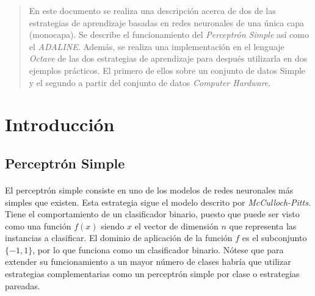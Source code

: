\documentclass{article}
\begin{document}
	\maketitle %

	\thispagestyle{fancy} %



	\begin{abstract}
		\noindent En este documento se realiza una descripción acerca de dos de las estrategias de aprendizaje basadas en redes neuronales de una única capa (monocapa). Se describe el funcionamiento del \emph{Perceptrón Simple} así como el \emph{ADALINE}. Además, se realiza una implementación en el lenguaje \emph{Octave} de las dos estrategias de aprendizaje para después utilizarla en dos ejemplos prácticos. El primero de ellos sobre un conjunto de datos Simple y el segundo a partir del conjunto de datos \emph{Computer Hardware}\cite{dataset:computer_hardware}.
	\end{abstract}



	\section{Introducción}
	\label{sec:introducción}

		\subsection{Perceptrón Simple}
		\label{sec:simple_perceptron}

			\paragraph{}
			El perceptrón simple consiste en uno de los modelos de redes neuronales más simples que existen. Esta estrategia sigue el modelo descrito por \emph{McCulloch-Pitts}. Tiene el comportamiento de un clasificador binario, puesto que puede ser visto como una función $f(x)$ siendo $x$ el vector de dimensión $n$ que representa las instancias a clasificar. El dominio de aplicación de la función $f$ es el subconjunto $\{-1,1\}$, por lo que funciona como un clasificador binario. Nótese que para extender su funcionamiento a un mayor número de clases habría que utilizar estrategias complementarias como un perceptrón simple por clase o estrategias pareadas.
\end{document}
